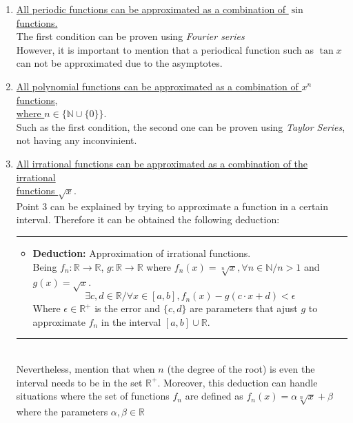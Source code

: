 \documentclass[a4paper, 11pt]{article}
\begin{document}
\begin{enumerate}
    \item \underline{All periodic functions can be approximated as a combination of $\sin$ functions.}\vspace{0.5em}\\
 The first condition can be proven using \textit{Fourier series}\\
 However, it is important to mention that a periodical function such as $\tan{x}$ can not be approximated due to the asymptotes. \\
    \item \underline{All polynomial functions can be approximated as a combination of $x^n$ functions,}\\
    \underline{where $n\in \{\mathbb{N} \cup \{0\}\}$}.\vspace{0.5em}\\
 Such as the first condition, the second one can be proven using \textit{Taylor Series}, not having any inconvinient.\\
    \item \underline{All irrational functions can be approximated as a combination of the irrational}\\
    \underline{functions $\sqrt{x}$}.\vspace{0.5em}\\
 Point 3 can be explained by trying to approximate a function in a certain interval. Therefore it can be obtained the following deduction:\\
    \rule{\linewidth}{0.4pt}
    \begin{itemize}
        \item \textbf{Deduction:} Approximation of irrational functions.\\
 Being $f_n:\mathbb{R}\rightarrow\mathbb{R}$, $g:\mathbb{R}\rightarrow\mathbb{R}$ where $f_n(x) = \sqrt[n]{x}, \forall n \in \mathbb{N} / n > 1$ and $g(x) = \sqrt{x}$.\\
        $$ \exists c,d \in \mathbb{R} / \forall x \in [a,b], f_n(x)- g(c\cdot x + d) < \epsilon$$ 
 Where $\epsilon\in\mathbb{R^+}$ is the error and $\{ c,d \}$ are parameters that ajust $g$ to approximate $f_n$ in the interval $[a,b]\cup \mathbb{R}$.
    \end{itemize}
    \rule{\linewidth}{0.4pt}\\
 Nevertheless, mention that when $n$ (the degree of the root) is even the interval needs to be in the set $\mathbb{R^+}$. Moreover, this deduction can handle situations where the set of functions $f_n$ are defined as $f_n(x) = \alpha \sqrt[n]{x} + \beta$ where the parameters $\alpha,\beta \in \mathbb{R}$ \\

\end{enumerate}
\end{document}
